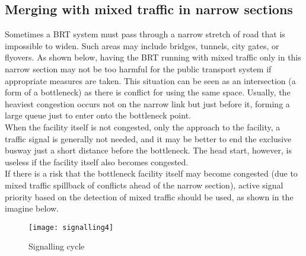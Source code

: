 \documentclass{article}
\begin{document}
\subsection{Merging with mixed traffic in narrow sections}
Sometimes a BRT system must pass through a narrow stretch of road that is impossible to widen. Such areas may include bridges, tunnels, city gates, or flyovers. As shown below, having the BRT running with mixed traffic only in this narrow section may not be too harmful for the public transport system if appropriate measures are taken. 
This situation can be seen as an intersection (a form of a bottleneck) as there is conflict for using the same space. Usually, the heaviest congestion occurs not on the narrow link but just before it, forming a large queue just to enter onto the bottleneck point.\\
When the facility itself is not congested, only the approach to the facility, a traffic signal is generally not needed, and it may be better to end the exclusive busway just a short distance before the bottleneck.  
The head start, however, is useless if the facility itself also becomes congested.\\
If there is a risk that the bottleneck facility itself may become congested (due to mixed traffic spillback of conflicts ahead of the narrow section), active signal priority based on the detection of mixed traffic should be used, as shown in the imagine below.
\begin{figure}[H]
\centering
\texttt{[image: signalling4]}
\caption{Signalling cycle}
\end{figure}
\newpage
\end{document}
